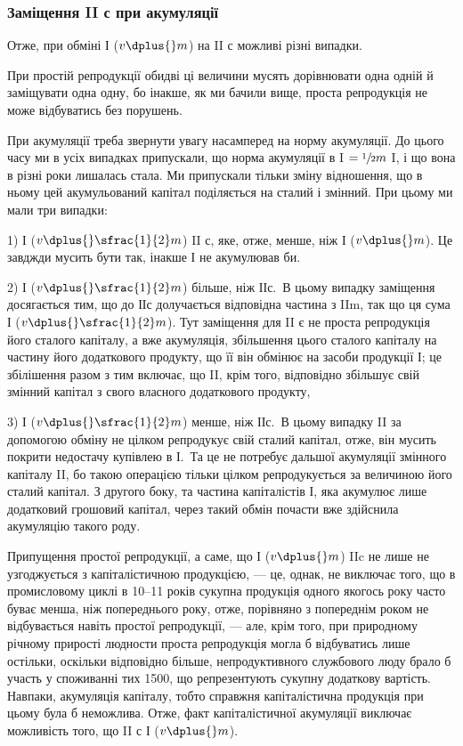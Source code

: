 
\subsubsection{Заміщення II с при акумуляції}

Отже, при обміні І ($v \dplus{} m$) на II с можливі різні випадки.

При простій репродукції обидві ці величини мусять дорівнювати одна
одній й заміщувати одна одну, бо інакше, як ми бачили вище, проста
репродукція не може відбуватись без порушень.

При акумуляції треба звернути увагу насамперед на норму акумуляції.
До цього часу ми в усіх випадках припускали, що норма акумуляції в I $=\sfrac{1}{2}m$ I,
і що вона в різні роки лишалась стала. Ми припускали
тільки зміну відношення, що в ньому цей акумульований капітал поділяється
на сталий і змінний. При цьому ми мали три випадки:

1) І ($v \dplus{} \sfrac{1}{2}m$) \deq{} II с, яке, отже, менше, ніж І ($v \dplus{} m$). Це завджди
мусить бути так, інакше І не акумулював би.

2) І ($v \dplus{} \sfrac{1}{2}m$) більше, ніж ІІс.~В цьому випадку заміщення досягається
тим, що до ІІс долучається відповідна частина з IIm, так що
ця сума \deq{} І ($v \dplus{} \sfrac{1}{2} m$). Тут заміщення для II є не проста репродукція
його сталого капіталу, а вже акумуляція, збільшення цього сталого капіталу
на частину його додаткового продукту, що її він обмінює на засоби
продукції І; це збілішення разом з тим включає, що II, крім того, відповідно
збільшує свій змінний капітал з свого власного додаткового продукту,

3) І ($v \dplus{} \sfrac{1}{2}m$) менше, ніж ІІс.~В цьому випадку II за допомогою
обміну не цілком репродукує свій сталий капітал, отже, він мусить покрити
недостачу купівлею в І.~Та це не потребує дальшої акумуляції
змінного капіталу II, бо такою операцією тільки цілком репродукується
за величиною його сталий капітал. З другого боку, та частина капіталістів
І, яка акумулює лише додатковий грошовий капітал, через такий
обмін почасти вже здійснила акумуляцію такого роду.

Припущення простої репродукції, а саме, що І ($v \dplus{} m$) \deq{} IIc не лише
не узгоджується з капіталістичною продукцією, — це, однак, не виключає
того, що в промисловому циклі в 10--11 років сукупна продукція одного
якогось року часто буває менша, ніж попереднього року, отже,
порівняно з попереднім роком не відбувається навіть простої репродукції,
— але, крім того, при природному річному прирості людности проста
репродукція могла б відбуватись лише остільки, оскільки відповідно
більше, непродуктивного службового люду брало б участь у споживанні
тих 1500, що репрезентують сукупну додаткову вартість. Навпаки, акумуляція
капіталу, тобто справжня капіталістична продукція при цьому
була б неможлива. Отже, факт капіталістичної акумуляції виключає можливість того, що II с \deq{} І ($v \dplus{} m$).

